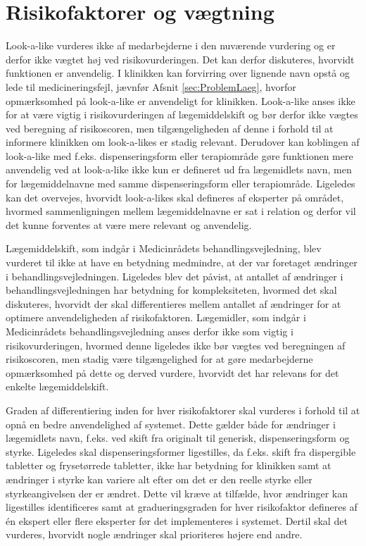 \section{Risikofaktorer og vægtning}
Look-a-like vurderes ikke af medarbejderne i den nuværende vurdering og er derfor ikke vægtet høj ved risikovurderingen. Det kan derfor diskuteres, hvorvidt funktionen er anvendelig. I klinikken kan forvirring over lignende navn opstå og lede til medicineringsfejl, jævnfør Afsnit \ref{sec:ProblemLaeg}, hvorfor opmærksomhed på look-a-like er anvendeligt for klinikken. Look-a-like anses ikke for at være vigtig i risikovurderingen af lægemiddelskift og bør derfor ikke vægtes ved beregning af risikoscoren, men tilgængeligheden af denne i forhold til at informere klinikken om look-a-likes er stadig relevant.
Derudover kan koblingen af look-a-like med f.eks. dispenseringsform eller terapiområde gøre funktionen mere anvendelig ved at look-a-like ikke kun er defineret ud fra lægemidlets navn, men for lægemiddelnavne med samme dispenseringsform eller terapiområde. Ligeledes kan det overvejes, hvorvidt look-a-likes skal defineres af eksperter på området, hvormed sammenligningen mellem lægemiddelnavne er sat i relation og derfor vil det kunne forventes at være mere relevant og anvendelig.

Lægemiddelskift, som indgår i Medicinrådets behandlingsvejledning, blev vurderet til ikke at have en betydning medmindre, at der var foretaget ændringer i behandlingsvejledningen. Ligeledes blev det påvist, at antallet af ændringer i behandlingsvejledningen har betydning for kompleksiteten, hvormed det skal diskuteres, hvorvidt der skal differentieres mellem antallet af ændringer for at optimere anvendeligheden af risikofaktoren. Lægemidler, som indgår i Medicinrådets behandlingsvejledning anses derfor ikke som vigtig i risikovurderingen, hvormed denne ligeledes ikke bør vægtes ved beregningen af risikoscoren, men stadig være tilgængelighed for at gøre medarbejderne opmærksomhed på dette og derved vurdere, hvorvidt det har relevans for det enkelte lægemiddelskift.

Graden af differentiering inden for hver risikofaktorer skal vurderes i forhold til at opnå en bedre anvendelighed af systemet. Dette gælder både for ændringer i lægemidlets navn, f.eks. ved skift fra originalt til generisk, dispenseringsform og styrke. Ligeledes skal dispenseringsformer ligestilles, da f.eks. skift fra dispergible tabletter og frysetørrede tabletter, ikke har betydning for klinikken samt at ændringer i styrke kan variere alt efter om det er den reelle styrke eller styrkeangivelsen der er ændret. Dette vil kræve at tilfælde, hvor ændringer kan ligestilles identificeres samt at gradueringsgraden for hver risikofaktor defineres af én ekspert eller flere eksperter før det implementeres i systemet. Dertil skal det vurderes, hvorvidt nogle ændringer skal prioriteres højere end andre. 

